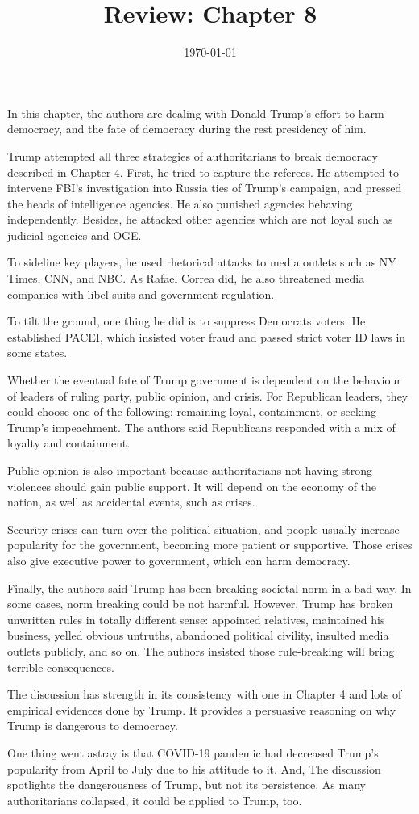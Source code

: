 \documentclass{homework}
\title{Review: Chapter 8}
\date{\today}
\begin{document}
\maketitle


In this chapter, the authors are dealing with Donald Trump's effort to harm democracy, and the fate of democracy during the rest presidency of him.

Trump attempted all three strategies of authoritarians to break democracy described in Chapter 4. First, he tried to capture the referees. He attempted to intervene FBI's investigation into Russia ties of Trump's campaign, and pressed the heads of intelligence agencies. He also punished agencies behaving independently. Besides, he attacked other agencies which are not loyal such as judicial agencies and OGE.

To sideline key players, he used rhetorical attacks to media outlets such as NY Times, CNN, and NBC. As Rafael Correa did, he also threatened media companies with libel suits and government regulation.

To tilt the ground, one thing he did is to suppress Democrats voters. He established PACEI, which insisted voter fraud and passed strict voter ID laws in some states.

Whether the eventual fate of Trump government is dependent on the behaviour of leaders of ruling party, public opinion, and crisis. For Republican leaders, they could choose one of the following: remaining loyal, containment, or seeking Trump's impeachment. The authors said Republicans responded with a mix of loyalty and containment.

Public opinion is also important because authoritarians not having strong violences should gain public support. It will depend on the economy of the nation, as well as accidental events, such as crises.

Security crises can turn over the political situation, and people usually increase popularity for the government, becoming more patient or supportive. Those crises also give executive power to government, which can harm democracy.

Finally, the authors said Trump has been breaking societal norm in a bad way. In some cases, norm breaking could be not harmful. However, Trump has broken unwritten rules in totally different sense: appointed relatives, maintained his business, yelled obvious untruths, abandoned political civility, insulted media outlets publicly, and so on. The authors insisted those rule-breaking will bring terrible consequences.

The discussion has strength in its consistency with one in Chapter 4 and lots of empirical evidences done by Trump. It provides a persuasive reasoning on why Trump is dangerous to democracy.

One thing went astray is that COVID-19 pandemic had decreased Trump's popularity from April to July due to his attitude to it. And, The discussion spotlights the dangerousness of Trump, but not its persistence. As many authoritarians collapsed, it could be applied to Trump, too.
\end{document}
